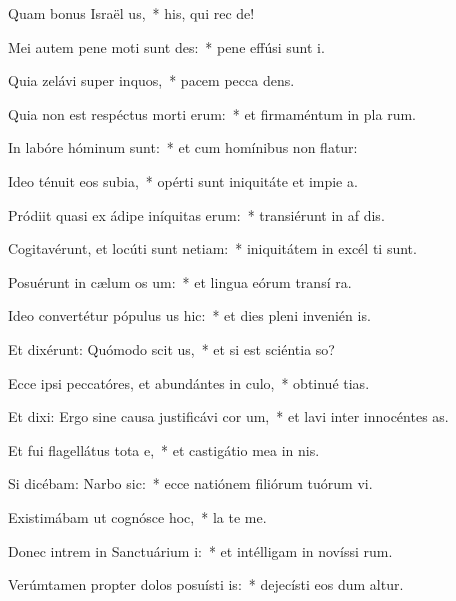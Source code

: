 \item Quam bonus Israël us,~* his, qui rec  de!
\item Mei autem pene moti sunt des:~* pene effúsi sunt  i.
\item Quia zelávi super inquos,~* pacem pecca dens.
\item Quia non est respéctus morti erum:~* et firmaméntum in pla rum.
\item In labóre hóminum  sunt:~* et cum homínibus non flatur:
\item Ideo ténuit eos subia,~* opérti sunt iniquitáte et impie a.
\item Pródiit quasi ex ádipe iníquitas erum:~* transiérunt in af dis.
\item Cogitavérunt, et locúti sunt netiam:~* iniquitátem in excél ti sunt.
\item Posuérunt in cælum os um:~* et lingua eórum transí  ra.
\item Ideo convertétur pópulus us hic:~* et dies pleni invenién  is.
\item Et dixérunt: Quómodo scit us,~* et si est sciéntia  so?
\item Ecce ipsi peccatóres, et abundántes in culo,~* obtinué tias.
\item Et dixi: Ergo sine causa justificávi cor um,~* et lavi inter innocéntes  as.
\item Et fui flagellátus tota e,~* et castigátio mea in nis.
\item Si dicébam: Narbo sic:~* ecce natiónem filiórum tuórum vi.
\item Existimábam ut cognósce hoc,~* la  te me.
\item Donec intrem in Sanctuárium i:~* et intélligam in novíssi rum.
\item Verúmtamen propter dolos posuísti is:~* dejecísti eos dum altur.
